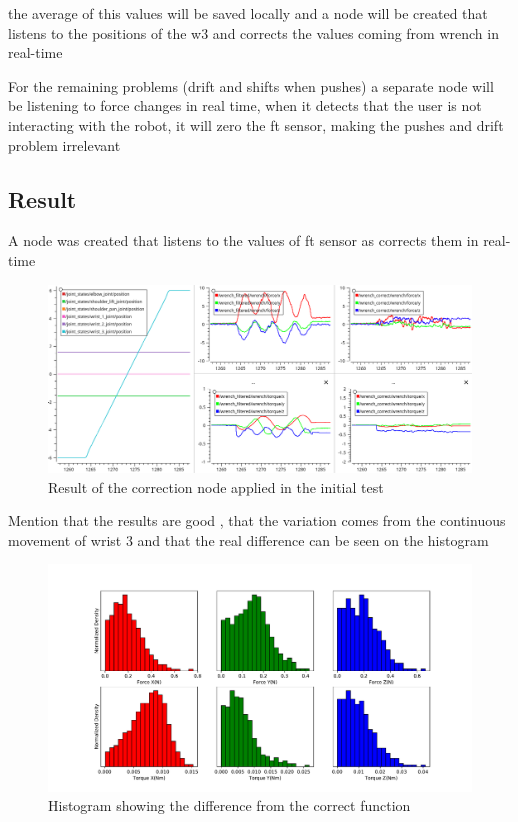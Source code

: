 \par the average of this values will be saved locally and a node will be created that listens to the positions of the w3 and corrects the values coming from wrench in real-time


\par For the remaining problems (drift and shifts when pushes) a separate node will be listening to force changes in real time, when it detects that the user is not interacting with the robot, it will zero the ft sensor, making the pushes and drift problem irrelevant


\subsection{Result}

\par A node was created that listens to the values of ft sensor as corrects them in real-time

\begin{figure}[h]
    \centering
    \includegraphics[width=0.9\linewidth]{figs/chp3/wrist_3_result.png}
    \caption{Result of the correction node applied in the initial test}
    \label{fig:w3_result}
\end{figure}

\par Mention that the results are good , that the variation comes from the continuous movement of wrist 3 and that the real difference can be seen on the histogram


\begin{figure}[h]
    \centering
    \includegraphics[width=\linewidth]{figs/chp3/wrist_3_result_hist.pdf}
    \caption{Histogram showing the difference from the correct function}
    \label{fig:w3_result_hist}
\end{figure}


